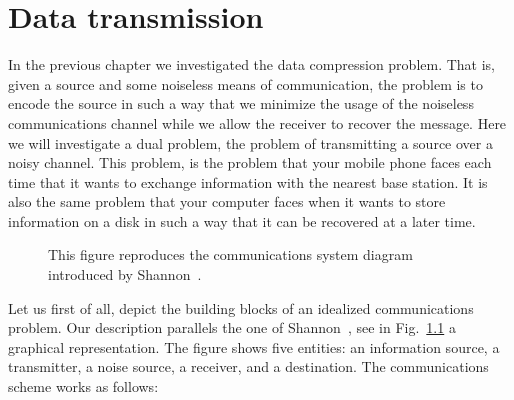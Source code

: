 \usechapterimagetrue
{} %
\chapter{Data transmission}
\usechapterimagefalse

In the previous chapter we investigated the data compression problem. That is, given a source and some noiseless means of communication, the problem is to encode the source in such a way that we minimize the usage of the noiseless communications channel while we allow the receiver to recover the message. Here we will investigate a dual problem, the problem of transmitting a source over a noisy channel. This problem, is the problem that your mobile phone faces each time that it wants to exchange information with the nearest base station. %
It is also the same problem that your computer faces when it wants to store information on a disk in such a way that it can be recovered at a later time. %
\label{sec:comprob}
\begin{figure}[h!]
\begin{center}
\def\svgwidth{\columnwidth} 

\end{center}
\caption[Communications system diagram.]{This figure reproduces the communications system diagram introduced by Shannon~\cite{Shannon_48}.}
\label{fig:shannoncom}
\end{figure}
Let us first of all, depict the building blocks of an idealized communications problem. Our description parallels the one of Shannon~\cite{Shannon_48}, see in Fig.~\ref{fig:shannoncom} a graphical representation. The figure shows five entities: an information source, a transmitter, a noise source, a receiver, and a destination. The communications scheme works as follows: 

